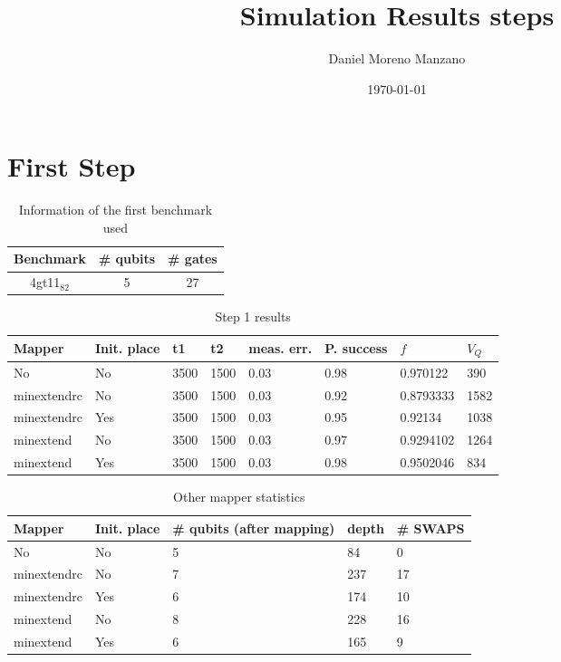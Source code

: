 \documentclass[11pt]{article}
\author{Daniel Moreno Manzano}
\date{\today}
\title{Simulation Results steps}
\begin{document}
\maketitle


\section{First Step}
\label{sec:orgd73546b}

\begin{table}[htbp]
\caption{\label{tab:org286ee49}
Information of the first benchmark used}
\centering
\begin{tabular}{|c|c|c|}
\hline
Benchmark & \# qubits & \# gates\\
\hline
4gt11\(_{\text{82}}\) & 5 & 27\\
\hline
\end{tabular}
\end{table}

\begin{table}[htbp]
\caption{\label{tab:org2f9c7e2}
Step 1 results}
\centering
\begin{tabular}{|p{2cm}|p{1cm}|p{1cm}|p{1cm}|p{1cm}|p{1cm}|p{2cm}|p{1cm}|}
\hline
Mapper & Init. place & t1 & t2 & meas. err. & P. success & \(f\) & \(V_Q\)\\
\hline
No & No & 3500 & 1500 & 0.03 & 0.98 & 0.970122 & 390\\
minextendrc & No & 3500 & 1500 & 0.03 & 0.92 & 0.8793333 & 1582\\
minextendrc & Yes & 3500 & 1500 & 0.03 & 0.95 & 0.92134 & 1038\\
minextend & No & 3500 & 1500 & 0.03 & 0.97 & 0.9294102 & 1264\\
minextend & Yes & 3500 & 1500 & 0.03 & 0.98 & 0.9502046 & 834\\
\hline
\end{tabular}
\end{table}

\begin{table}[htbp]
\caption{\label{tab:orgceaf20c}
Other mapper statistics}
\centering
\begin{tabular}{|p{2cm}|p{2cm}|p{2cm}|p{2cm}|p{2cm}|}
\hline
Mapper & Init. place & \# qubits (after mapping) & depth & \# SWAPS\\
\hline
No & No & 5 & 84 & 0\\
minextendrc & No & 7 & 237 & 17\\
minextendrc & Yes & 6 & 174 & 10\\
minextend & No & 8 & 228 & 16\\
minextend & Yes & 6 & 165 & 9\\
\hline
\end{tabular}
\end{table}
\end{document}
